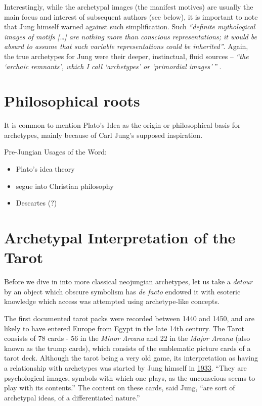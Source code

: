\documentclass[
]{book}
\providecommand{\tightlist}{%
  \setlength{\itemsep}{0pt}\setlength{\parskip}{0pt}}
\begin{document}
Interestingly, while the archetypal images (the manifest motives) are usually the main focus and interest of subsequent authors (see below), it is important to note that Jung himself warned against such simplification. Such \emph{``definite mythological images of motifs {[}\ldots{]} are nothing more than conscious representations; it would be absurd to assume that such variable representations could be inherited''}. Again, the true archetypes for Jung were their deeper, instinctual, fluid sources -- \emph{``the `archaic remnants', which I call `archetypes' or `primordial images'\,''} \citep{jung1964approaching}.

\hypertarget{philosophical-roots}{%
\section{Philosophical roots}\label{philosophical-roots}}

It is common to mention Plato's Idea as the origin or philosophical basis for archetypes, mainly because of Carl Jung's supposed inspiration.

Pre-Jungian Usages of the Word:

\begin{itemize}
\tightlist
\item
  Plato's idea theory
\item
  segue into Christian philosophy
\item
  Descartes (?)
\end{itemize}

\hypertarget{archetypal-interpretation-of-the-tarot}{%
\section{Archetypal Interpretation of the Tarot}\label{archetypal-interpretation-of-the-tarot}}

Before we dive in into more classical neojungian archetypes, let us take a \emph{detour} by an object which obscure symbolism has \emph{de facto} endowed it with esoteric knowledge which access was attempted using archetype-like concepts.

The first documented tarot packs were recorded between 1440 and 1450, and are likely to have entered Europe from Egypt in the late 14th century. The Tarot consists of 78 cards - 56 in the \emph{Minor Arcana} and 22 in the \emph{Major Arcana} (also known as the trump cards), which consists of the emblematic picture cards of a tarot deck. Although the tarot being a very old game, its interpretation as having a relationship with archetypes was started by Jung himself in \href{https://marykgreer.com/2008/03/31/carl-jung-and-tarot/}{1933}. ``They are psychological images, symbols with which one plays, as the unconscious seems to play with its contents.'' The content on these cards, said Jung, ``are sort of archetypal ideas, of a differentiated nature.''
\end{document}
